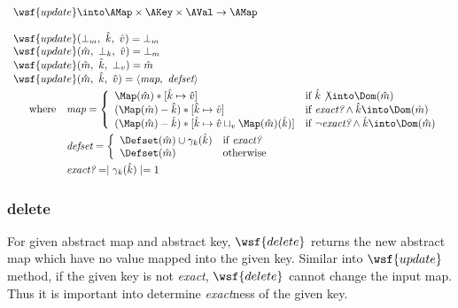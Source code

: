 $\begin{array}{l}
\wsf{update} \into \AMap \times \AKey \times \AVal \rightarrow \AMap \\\\

\wsf{update}(\bot_m,\ \hat{k},\ \hat{v}) = \bot_m \\
\wsf{update}(\hat{m},\ \bot_k,\ \hat{v}) = \bot_m \\
\wsf{update}(\hat{m},\ \hat{k},\ \bot_{v}) = \hat{m} \\

\wsf{update}(\hat{m},\ \hat{k},\ \hat{v}) = \langle \emph{map},\ \emph{defset} \rangle \vspace{1mm}\\
\quad \begin{array}{rl} \textrm{where}
& \emph{map} = \left \{ \begin{array}{ll}
\Map(\hat{m}) \ast [ \hat{k} \mapsto \hat{v} ]
& \textrm{if } \hat{k} \not\into \Dom(\hat{m}) \\

(\Map(\hat{m}) - \hat{k}) \ast [ \hat{k} \mapsto \hat{v}]
& \textrm{if } \emph{exact?} \land \hat{k}\into \Dom(\hat{m}) \\

(\Map(\hat{m}) - \hat{k})
\ast [ \hat{k} \mapsto \hat{v} \sqcup_v \Map(\hat{m})(\hat{k}) ]
& \textrm{if } \neg \emph{exact?} \land \hat{k}\into \Dom(\hat{m}) \\
\end{array} \right. \vspace{1mm}\\

& \emph{defset} = \left \{ \begin{array}{ll}
\Defset(\hat{m}) \cup \gamma_k(\hat{k}) & \textrm{if} ~ \emph{exact?} \\
\Defset(\hat{m}) & \textrm{otherwise}\\
\end{array} \right. \vspace{1mm}\\

& \emph{exact?} = \mid \gamma_k(\hat{k}) \mid = 1 \\
\end{array} \\
\end{array} $

\subsubsection{delete}
For given abstract map and abstract key, 
$\wsf{delete}$ returns the new abstract map 
which have no value mapped into the given key.
Similar into $\wsf{update}$ method,
if the given key is not \emph{exact},
$\wsf{delete}$ cannot change the input map.
Thus it is important into determine \emph{exact}ness of the given key.\\

